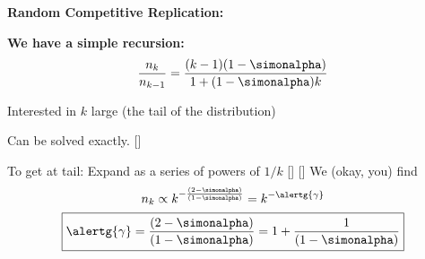   \textbf{Random Competitive Replication:}

  \textbf{We have a simple recursion:}
    $$  \frac{n_k}{n_{k-1}}
    =
    \frac{(k-1)(1-\simonalpha)}
    {1+(1-\simonalpha)k}
    $$
    
    
     
      Interested in $k$ large (the tail of the distribution)
    
      Can be solved exactly.
    []
    
      To get at tail: Expand as a series of powers of $1/k$
    []
    []
      We (okay, you) find
      $$
      n_k \propto k^{-\frac{(2-\simonalpha)}{(1-\simonalpha)}}  = k^{-\alertg{\gamma}}
      $$
      $$
      \boxed{
        \alertg{\gamma} = \frac{(2-\simonalpha)}{(1-\simonalpha)} = 1 + \frac{1}{(1-\simonalpha)}
      }
      $$
    
  



